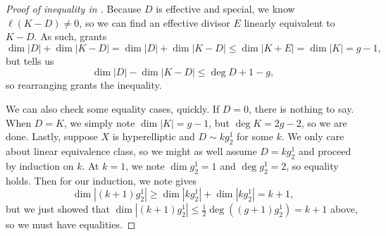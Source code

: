 \documentclass[../notes.tex]{subfiles}
\begin{document}
\begin{proof}[Proof of inequality in ]
	Because $D$ is effective and special, we know $\ell(K-D)\ne0$, so we can find an effective divisor $E$ linearly equivalent to $K-D$. As such,  grants
	\[\dim|D|+\dim|K-D|=\dim|D|+\dim|K-D|\le\dim|K+E|=\dim|K|=g-1,\]
	but  tells us
	\[\dim|D|-\dim|K-D|\le\deg D+1-g,\]
	so rearranging grants the inequality.

	We can also check some equality cases, quickly. If $D=0$, there is nothing to say. When $D=K$, we simply note $\dim|K|=g-1$, but $\deg K=2g-2$, so we are done. Lastly, suppose $X$ is hyperelliptic and $D\sim kg^1_2$ for some $k$. We only care about linear equivalence class, so we might as well assume $D=kg^1_2$ and proceed by induction on $k$. At $k=1$, we note $\dim g^1_2=1$ and $\deg g^1_2=2$, so equality holds. Then for our induction, we note  gives
	\[\dim\left|(k+1)g^1_2\right|\ge\dim\left|kg^1_2\right|+\dim\left|kg^1_2\right|=k+1,\]
	but we just showed that $\dim\left|(k+1)g^1_2\right|\le\frac12\deg\left((g+1)g^1_2\right)=k+1$ above, so we must have equalities.
\end{proof}
\end{document}
